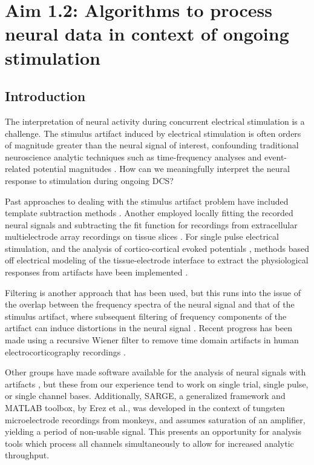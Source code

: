 
 
 
\chapter {Aim 1.2: Algorithms to process neural data in context of ongoing stimulation}

\section{Introduction}

The interpretation of neural activity during concurrent electrical stimulation is a challenge. The stimulus artifact induced by electrical stimulation is often orders of magnitude greater than the neural signal of interest, confounding traditional neuroscience analytic techniques such as time-frequency analyses and event-related potential magnitudes \cite{Zhou2018}. How can we meaningfully interpret the neural response to stimulation during ongoing DCS? 

Past approaches to dealing with the stimulus artifact problem have included template subtraction methods \cite{Hashimoto2002}.  Another employed locally fitting the recorded neural signals and subtracting the fit function for recordings from extracellular multielectrode array recordings on tissue slices \cite{Wagenaar2002}. For single pulse electrical stimulation, and the analysis of cortico-cortical evoked potentials \cite{Matsumoto2004b}, methods based off electrical modeling of the tissue-electrode interface to extract the physiological responses from artifacts have been implemented \cite{Trebaul2016}. 

Filtering is another approach that has been used, but this runs into the issue of the overlap between the frequency spectra of the neural signal and that of the stimulus artifact, where subsequent filtering of frequency components of the artifact can induce distortions in the neural signal \cite{Nagel2000}. Recent progress has been made using a recursive Wiener filter to remove time domain artifacts in human electrocorticography recordings \cite{Mouthaan2016}. 

Other groups have made software available for the analysis of neural signals with artifacts \cite{Erez2010, Herring2015}, but these from our experience tend to work on single trial, single pulse, or single channel bases. Additionally, SARGE, a generalized framework and MATLAB toolbox, by Erez et al., was developed in the context of tungsten microelectrode recordings from monkeys, and assumes saturation of an amplifier, yielding a period of non-usable signal. This presents an opportunity for analysis tools which process all channels simultaneously to allow for increased analytic throughput.

